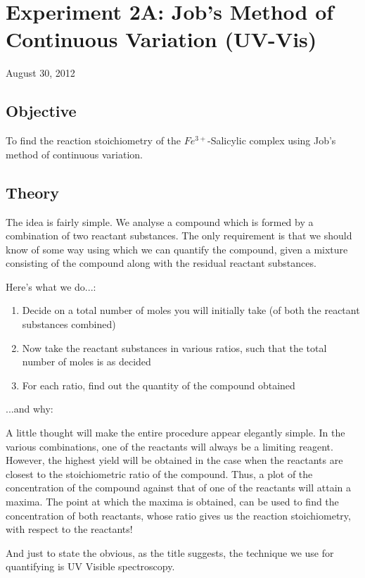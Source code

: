 \chapter{Experiment 2A: Job's Method of Continuous Variation (UV-Vis)}
\begin{flushright}
August 30, 2012
\end{flushright}

\section{Objective}
	To find the reaction stoichiometry of the $Fe^{3+}$-Salicylic complex using Job's method of continuous variation.

\section{Theory}
	The idea is fairly simple. We analyse a compound which is formed by a combination of two reactant substances. The only requirement is that we should know of some way using which we can quantify the compound, given a mixture consisting of the compound along with the residual reactant substances.
	\par
	Here's what we do...:
	\begin{enumerate}
		\item Decide on a total number of moles you will initially take (of both the reactant substances combined)
		\item Now take the reactant substances in various ratios, such that the total number of moles is as decided
		\item For each ratio, find out the quantity of the compound obtained
	\end{enumerate} 
	...and why:
	\par
	A little thought will make the entire procedure appear elegantly simple. In the various combinations, one of the reactants will always be a limiting reagent. However, the highest yield will be obtained in the case when the reactants are closest to the stoichiometric ratio of the compound. Thus, a plot of the concentration of the compound against that of one of the reactants will attain a maxima. The point at which the maxima is obtained, can be used to find the concentration of both reactants, whose ratio gives us the reaction stoichiometry, with respect to the reactants!
	\par
	And just to state the obvious, as the title suggests, the technique we use for quantifying is UV Visible spectroscopy.
